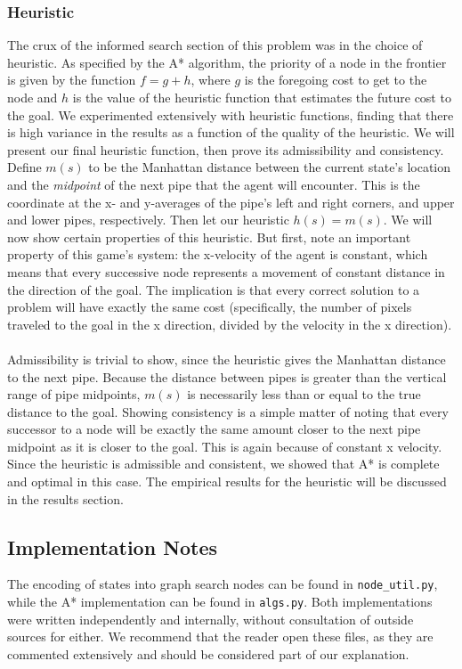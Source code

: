\documentclass[11pt]{article}
\begin{document}
\subsubsection{Heuristic}
The crux of the informed search section of this problem was in the choice of heuristic.
As specified by the A* algorithm, the priority of a node in the frontier is given
by the function $f = g + h$, where $g$ is the foregoing cost to get to the node and
$h$ is the value of the heuristic function that estimates the future cost to the goal.
We experimented extensively with heuristic functions, finding that there is high variance
in the results as a function of the quality of the heuristic. We will present our
final heuristic function, then prove its admissibility and consistency. Define $m(s)$
to be the Manhattan distance between the current state's location and the \emph{midpoint}
of the next pipe that the agent will encounter. This is the coordinate at the x-
and y-averages of the pipe's left and right corners, and upper and lower pipes,
respectively. Then let our heuristic $h(s) = m(s)$. We will now show certain
properties of this heuristic. But first, note an important property of this game's
system: the x-velocity of the agent is constant, which means that every successive
node represents a movement of constant distance in the direction of the goal.
The implication is that every correct solution to a problem will have exactly
the same cost (specifically, the number of pixels traveled to the goal in the x
direction, divided by the velocity in the x direction). \\\\
Admissibility is trivial to show, since the heuristic gives the Manhattan distance to
the next pipe. Because the distance between pipes is greater than the vertical range
of pipe midpoints, $m(s)$ is necessarily less than or equal to the true distance to the
goal. Showing consistency is a simple matter of noting that every successor to a node
will be exactly the same amount closer to the next pipe midpoint as it is closer
to the goal. This is again because of constant x velocity. Since the heuristic
is admissible and consistent, we showed that A* is complete and optimal in this case.
The empirical results for the heuristic will be discussed in the results section.

\subsection{Implementation Notes}
The encoding of states into graph search nodes can be found in \texttt{node_util.py},
while the A* implementation can be found in \texttt{algs.py}. Both implementations
were written independently and internally, without consultation of outside sources
for either. We recommend that the reader open these files, as they are commented
extensively and should be considered part of our explanation.
\end{document}
